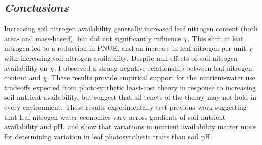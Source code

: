 \subsection{\textit{Conclusions}}
\noindent Increasing soil nitrogen availability generally increased leaf nitrogen content (both area- and mass-based), but did not significantly influence $\chi$. This shift in leaf nitrogen led to a reduction in PNUE, and an increase in leaf nitrogen per unit $\chi$ with increasing soil nitrogen availability. Despite null effects of soil nitrogen availability on $\chi$, I observed a strong negative relationship between leaf nitrogen content and $\chi$. These results provide empirical support for the nutrient-water use tradeoffs expected from photosynthetic least-cost theory in response to increasing soil nutrient availability, but suggest that all tenets of the theory may not hold in every environment. These results experimentally test previous work suggesting that leaf nitrogen-water economies vary across gradients of soil nutrient availability and pH, and show that variations in nutrient availability matter more for determining variation in leaf photosynthetic traits than soil pH.
